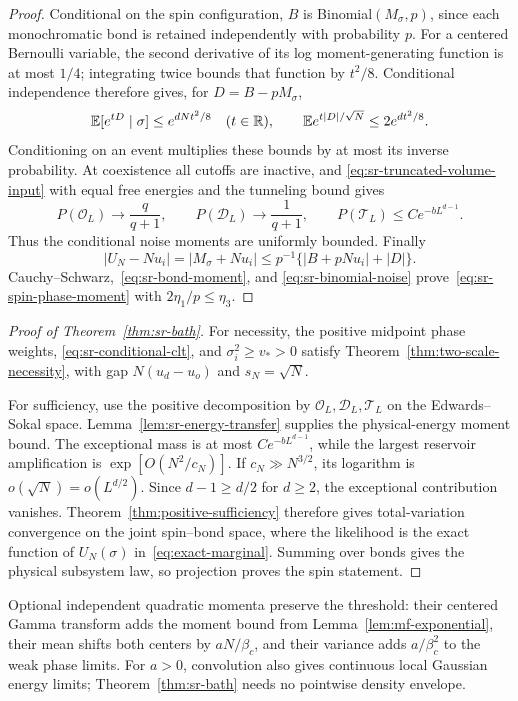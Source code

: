 \begin{proof}
Conditional on the spin configuration, $B$ is Binomial$(M_\sigma,p)$,
since each monochromatic bond is retained independently with probability $p$.
For a centered Bernoulli variable, the second derivative of its log
moment-generating function is at most $1/4$; integrating twice bounds
that function by $t^2/8$. Conditional independence therefore gives,
for $D=B-pM_\sigma$,
\begin{equation}
 \mathbb E[e^{tD}\mid\sigma]\le e^{dNt^2/8}
 \quad(t\in\mathbb R),\qquad
 \mathbb E e^{t|D|/\sqrt N}\le2e^{dt^2/8}.
 \label{eq:sr-binomial-noise}
\end{equation}
Conditioning on an event multiplies these bounds by at most its
inverse probability. At coexistence all cutoffs are inactive, and
\eqref{eq:sr-truncated-volume-input} with equal free energies and the
tunneling bound gives
\begin{equation}
 P(\mathcal O_L)\to\frac q{q+1},\qquad
 P(\mathcal D_L)\to\frac1{q+1},\qquad
 P(\mathcal T_L)\le Ce^{-bL^{d-1}}.
 \label{eq:sr-positive-phase-probabilities}
\end{equation}
Thus the conditional noise moments are uniformly bounded. Finally
\[
 |U_N-Nu_i|=|M_\sigma+Nu_i|
 \le p^{-1}\{|B+pNu_i|+|D|\}.
\]
Cauchy--Schwarz,~\eqref{eq:sr-bond-moment}, and
\eqref{eq:sr-binomial-noise} prove~\eqref{eq:sr-spin-phase-moment}
with $2\eta_1/p\le\eta_3$.
\end{proof}

\begin{proof}[Proof of Theorem~\ref{thm:sr-bath}]
For necessity, the positive midpoint phase weights,
\eqref{eq:sr-conditional-clt}, and $\sigma_i^2\ge v_*>0$ satisfy
Theorem~\ref{thm:two-scale-necessity}, with gap $N(u_d-u_o)$ and
$s_N=\sqrt N$.

For sufficiency, use the positive decomposition by
$\mathcal O_L,\mathcal D_L,\mathcal T_L$ on the Edwards--Sokal space.
Lemma~\ref{lem:sr-energy-transfer} supplies the physical-energy moment
bound. The exceptional mass is at most $Ce^{-bL^{d-1}}$, while the
largest reservoir amplification is $\exp[O(N^2/c_N)]$. If
$c_N\gg N^{3/2}$, its logarithm is $o(\sqrt N)=o(L^{d/2})$.
Since $d-1\ge d/2$ for $d\ge2$, the exceptional contribution vanishes.
Theorem~\ref{thm:positive-sufficiency} therefore gives total-variation
convergence on the joint spin--bond space, where the likelihood is the
exact function of $U_N(\sigma)$ in~\eqref{eq:exact-marginal}. Summing
over bonds gives the physical subsystem law, so projection proves the
spin statement.
\end{proof}

Optional independent quadratic momenta preserve the threshold: their
centered Gamma transform adds the moment bound from
Lemma~\ref{lem:mf-exponential}, their mean shifts both centers by
$aN/\beta_c$, and their variance adds $a/\beta_c^2$ to the weak phase
limits. For $a>0$, convolution also gives continuous local Gaussian
energy limits; Theorem~\ref{thm:sr-bath} needs no pointwise density
envelope.
